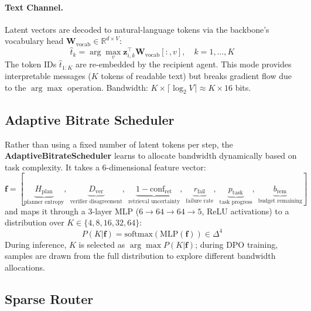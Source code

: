 \documentclass{article}
\newcommand{\RR}{\mathbb{R}}
\begin{document}
\paragraph{Text Channel.}
Latent vectors are decoded to natural-language tokens via the backbone's vocabulary head $\mathbf{W}_\text{vocab} \in \RR^{d \times V}$:
\begin{equation}
\hat{t}_k = \arg\max_v \mathbf{z}_{i,k}^\top \mathbf{W}_\text{vocab}[:,v], \quad k = 1,\ldots,K
\end{equation}
The token IDs $\hat{t}_{1:K}$ are re-embedded by the recipient agent.  This mode provides interpretable messages ($K$ tokens of readable text) but breaks gradient flow due to the $\arg\max$ operation.  Bandwidth: $K \times \lceil\log_2 V\rceil \approx K \times 16$ bits.

\subsection{Adaptive Bitrate Scheduler}
\label{sec:bitrate}

Rather than using a fixed number of latent tokens per step, the \textbf{AdaptiveBitrateScheduler} learns to allocate bandwidth dynamically based on task complexity.  It takes a 6-dimensional feature vector:
\begin{equation}
\mathbf{f} = [\underbrace{H_\text{plan}}_{\text{planner entropy}},\; \underbrace{D_\text{ver}}_{\text{verifier disagreement}},\; \underbrace{1 - \text{conf}_\text{ret}}_{\text{retrieval uncertainty}},\; \underbrace{r_\text{fail}}_{\text{failure rate}},\; \underbrace{p_\text{task}}_{\text{task progress}},\; \underbrace{b_\text{rem}}_{\text{budget remaining}}]
\label{eq:bitrate_features}
\end{equation}
and maps it through a 3-layer MLP ($6 \to 64 \to 64 \to 5$, ReLU activations) to a distribution over $K \in \{4, 8, 16, 32, 64\}$:
\begin{equation}
P(K | \mathbf{f}) = \text{softmax}(\text{MLP}(\mathbf{f})) \in \Delta^4
\label{eq:bitrate_policy}
\end{equation}
During inference, $K$ is selected as $\arg\max P(K|\mathbf{f})$; during DPO training, samples are drawn from the full distribution to explore different bandwidth allocations.

\subsection{Sparse Router}
\label{sec:router}
\end{document}
